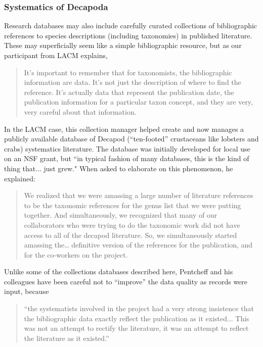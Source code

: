 \subsubsection{Systematics of Decapoda}
Research databases may also include carefully curated collections of bibliographic references to species descriptions (including taxonomies) in published literature. These may superficially seem like a simple bibliographic resource, but as our participant from LACM explains,
\begin{quote}
It’s important to remember that for taxonomists, the bibliographic information are data. It's not just the description of where to find the reference. It's actually data that represent the publication date, the publication information for a particular taxon concept, and they are very, very careful about that information.
\end{quote}
In the LACM case, this collection manager helped create and now manages a publicly available database of Decapod (“ten-footed” crustaceans like lobsters and crabs) systematics literature. The database was initially developed for local use on an NSF grant, but “in typical fashion of many databases, this is the kind of thing that... just grew." When asked to elaborate on this phenomenon, he explained:
\begin{quote}
We realized that we were amassing a large number of literature references to be the taxonomic references for the genus list that we were putting together. And simultaneously, we recognized that many of our collaborators who were trying to do the taxonomic work did not have access to all of the decapod literature. So, we simultaneously started amassing the… definitive version of the references for the publication, and for the co-workers on the project.
\end{quote}
Unlike some of the collections databases described here, Pentcheff and his colleagues have been careful not to “improve” the data quality as records were input, because \begin{quote}“the systematists involved in the project had a very strong insistence that the bibliographic data exactly reflect the publication as it existed... This was not an attempt to rectify the literature, it was an attempt to reflect the literature as it existed.”\end{quote} 

